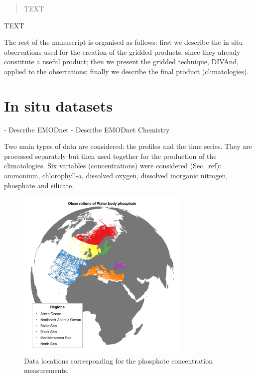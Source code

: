 \documentclass[essd, manuscript]{copernicus}
\begin{document}

\maketitle



\begin{abstract}
TEXT
\end{abstract}


\introduction  %
TEXT

The rest of the manuscript is organised as follows: first we describe the in situ observations used for the creation of the gridded products, since they already constitute a useful product; then we present the gridded technique, DIVAnd, applied to the obsertations; finally we describe the final product (climatologies). 


\section{In situ datasets\label{sec:insitu}}

- Describe EMODnet \citep{MartinMiguez2019} 
- Describe EMODnet Chemistry \citep{Giorgetti2018}

Two main types of data are considered: the profiles and the time series. They are processed separately but then used together for the production of the climatologies. Six variables (concentrations) were considered (Sec.~ref{}): ammonium, chlorophyll-a, dissolved oxygen, dissolved inorganic nitrogen, phosphate and silicate.


\begin{figure}[t]
\includegraphics[width=8.3cm]{observations_Water_body_phosphate.png}
\caption{Data locations corresponding for the phosphate concentration measurements.\label{fig:phosphatedata}}
\end{figure}
\end{document}
